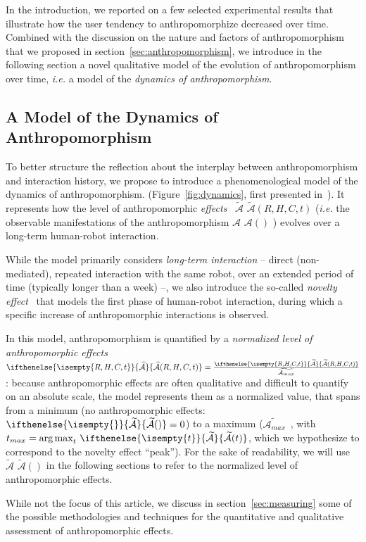 \documentclass{frontiersSCNS} %
\newcommand{\ie}{\textit{i.e.}\xspace}
\newcommand{\Ant}[1][]{%
      \ifthenelse{\isempty{#1}}%
        {$\mathcal{A}$}
        {$\mathcal{A}(#1)$}
}
\newcommand{\AntE}[1][]{%
      \ifthenelse{\isempty{#1}}%
      {$\widetilde{\mathcal{A}}$}
      {$\widetilde{\mathcal{A}}(#1)$}
}
\newcommand{\antE}[1][]{%
      \ifthenelse{\isempty{#1}}%
      {\widetilde{\mathcal{A}}}
          {\widetilde{\mathcal{A}}(#1)}
}
\newcommand{\antENorm}[1][]{%
      \ifthenelse{\isempty{#1}}%
      {\widehat{\mathcal{A}}}
      {\widehat{\mathcal{A}}(#1)}
}
\newcommand{\AntEMax}{{$\widetilde{\mathcal{A}_{max}}$~}}
\newcommand{\antEMax}{{\widetilde{\mathcal{A}_{max}}}}
\begin{document}
In the introduction, we reported on a few selected experimental results that
illustrate how the user tendency to anthropomorphize decreased over time.
Combined with the discussion on the nature and factors of anthropomorphism that
we proposed in section~\ref{sec:anthropomorphism}, we introduce in the following
section a novel qualitative model of the evolution of anthropomorphism over
time, \ie a model of the \emph{dynamics of anthropomorphism}.


\subsection{A Model of the Dynamics of Anthropomorphism}
\label{sec:dynamics-model}

To better structure the reflection about the interplay between anthropomorphism
and interaction history, we propose to introduce a phenomenological model of the
dynamics of anthropomorphism.  (Figure~\ref{fig:dynamics}, first presented
in~\citep{lemaignan2014dynamics}).  It represents how the level of
anthropomorphic \emph{effects}~\AntE[R,H,C,t] (\ie the observable manifestations
of the anthropomorphism \Ant) evolves over a long-term human-robot interaction.

While the model primarily considers \emph{long-term interaction} -- direct
(non-mediated), repeated interaction with the same robot, over an extended
period of time (typically longer than a week) --, we also introduce the
so-called \emph{novelty effect}~\citep{kanda_interactive_2004} that models the
first phase of human-robot interaction, during which a specific increase of
anthropomorphic interactions is observed.

In this model, anthropomorphism is quantified by a \emph{normalized level of
anthropomorphic effects} $\antENorm[R,H,C,t] = \frac{\antE[R,H,C,t]}{\antEMax}$:
because anthropomorphic effects are often qualitative and difficult to quantify
on an absolute scale, the model represents them as a normalized value, that
spans from a minimum (no anthropomorphic effects: $\antE=0$) to a maximum
(\AntEMax, with $t_{max} = \operatorname{arg\,max}_t \, \antE[t]$, which we
hypothesize to correspond to the novelty effect ``peak''). For the sake of
readability, we will use \AntE in the following sections to refer to the
normalized level of anthropomorphic effects.

While not the focus of this article, we discuss in section~\ref{sec:measuring}
some of the possible methodologies and techniques for the quantitative and
qualitative assessment of anthropomorphic effects.
\end{document}
